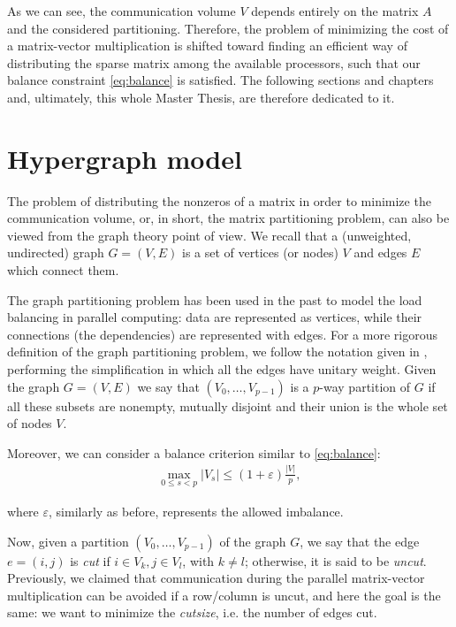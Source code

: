 As we can see, the communication volume $V$ depends entirely on the matrix $A$ and the considered partitioning. Therefore, the problem of minimizing the cost of a matrix-vector multiplication is shifted toward finding an efficient way of distributing the sparse matrix among the available processors, such that our balance constraint \eqref{eq:balance} is satisfied. The following sections and chapters and, ultimately, this whole Master Thesis, are therefore dedicated to it.

\section{Hypergraph model}

The problem of distributing the nonzeros of a matrix in order to minimize the communication volume, or, in short, the matrix partitioning problem, can also be viewed from the graph theory point of view. We recall that a (unweighted, undirected) graph $G=(V,E)$ is a set of vertices (or nodes) $V$ and edges $E$ which connect them. 

The graph partitioning problem has been used in the past to model the load balancing in parallel computing: data are represented as vertices, while their connections (the dependencies) are represented with edges. For a more rigorous definition of the graph partitioning problem, we follow the notation given in \cite{hypergraph_model},  performing the simplification in which all the edges have unitary weight. Given the graph $G=(V,E)$ we say that $(V_0,\dots,V_{p-1})$ is a $p$-way partition of $G$ if all these subsets are nonempty, mutually disjoint and their union is the whole set of nodes $V$. 

Moreover, we can consider a balance criterion similar to \eqref{eq:balance}:
\begin{align}
	\max_{0\leq s <p}	|V_s| \leq (1+\varepsilon)\frac{|V|}{p},
	\label{eq:balance_hypergraph}
\end{align}

where $\varepsilon$, similarly as before, represents the allowed imbalance.

Now, given a partition $(V_0,\dots,V_{p-1})$ of the graph $G$, we say that the edge $e=(i,j)$ is \emph{cut} if $i \in V_k, j \in V_l$, with $k \neq l$; otherwise, it is said to be \emph{uncut}. Previously, we claimed that communication during the parallel matrix-vector multiplication can be avoided if a row/column is uncut, and here the goal is the same: we want to minimize the \emph{cutsize}, i.e. the number of edges cut.

